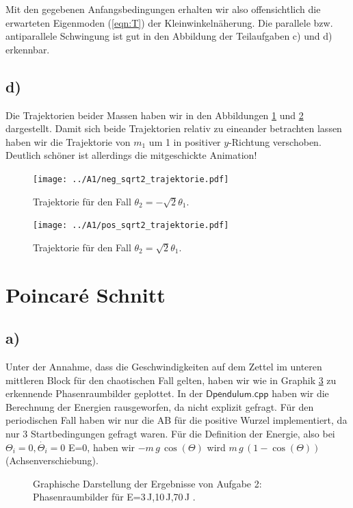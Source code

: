 Mit den gegebenen Anfangsbedingungen erhalten wir also offensichtlich die erwarteten Eigenmoden
(\ref{eqn:T}) der Kleinwinkelnäherung. Die parallele bzw. antiparallele Schwingung ist gut in den
Abbildung der Teilaufgaben c) und d) erkennbar.

\subsection*{d)}
Die Trajektorien beider Massen haben wir in den Abbildungen \ref{fig:neg_traj} und \ref{fig:pos_traj}
dargestellt. Damit sich beide Trajektorien relativ zu eineander betrachten lassen haben wir die
Trajektorie von $m_1$ um 1 in positiver $y$-Richtung verschoben. Deutlich schöner ist allerdings die
mitgeschickte Animation!
\begin{figure}
	\centering
	\texttt{[image: ../A1/neg\_sqrt2\_trajektorie.pdf]}
	\caption{Trajektorie für den Fall $\theta_2 = -\sqrt{2}\theta_1$.}
	\label{fig:neg_traj}
\end{figure}
\begin{figure}
	\centering
	\texttt{[image: ../A1/pos\_sqrt2\_trajektorie.pdf]}
	\caption{Trajektorie für den Fall $\theta_2 = \sqrt{2}\theta_1$.}
	\label{fig:pos_traj}
\end{figure}

\section*{Poincar\'{e} Schnitt}
\subsection*{a)}
Unter der Annahme, dass die Geschwindigkeiten auf dem Zettel im unteren mittleren Block für den chaotischen Fall gelten, haben wir wie in Graphik \ref{fig:OsziC1} zu erkennende Phasenraumbilder geplottet. In der $\textsf{Dpendulum.cpp}$ haben wir die Berechnung der Energien rausgeworfen, da nicht explizit gefragt. Für den periodischen Fall haben wir nur die AB für die positive Wurzel implementiert, da nur 3 Startbedingungen gefragt waren. Für die Definition der Energie, also bei $\Theta_i = 0, \dot{\Theta_i} = 0$ E=0, haben wir $-m\,g\,\cos(\Theta)$ wird $m\,g\,(1-\cos(\Theta))$ (Achsenverschiebung).

\begin{landscape}
	\begin{figure}
		\caption{Graphische Darstellung der Ergebnisse von Aufgabe 2: Phasenraumbilder für E=3$\,$J,10$\,$J,70$\,$J .}
		\label{fig:OsziC1}
	\end{figure}
\end{landscape} 
